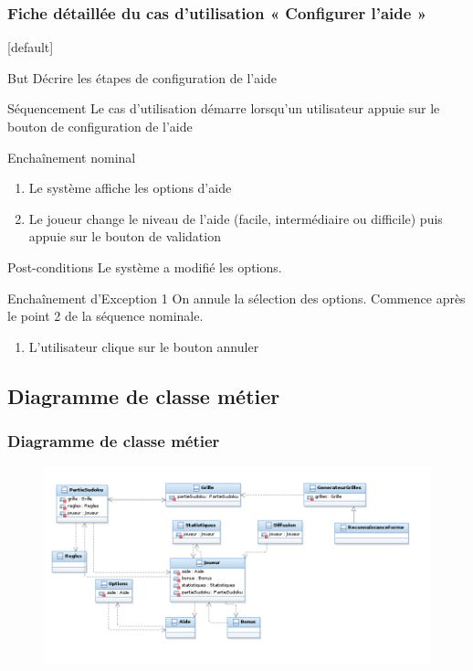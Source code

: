 \documentclass{beamer}
\begin{document}
\begin{frame}
  \frametitle{Fiche détaillée du cas d'utilisation « Configurer l’aide »}
  [default]
  \begin{block}{\footnotesize{But}}
\scriptsize{Décrire les étapes de configuration de l’aide}
  \end{block}
  \pause
  \begin{block}{\footnotesize{Séquencement}}
\scriptsize{Le cas d'utilisation démarre lorsqu’un utilisateur appuie sur le bouton de configuration de l’aide}
  \end{block}
  \pause
  \begin{block}{\footnotesize{Enchaînement nominal}}
    \begin{enumerate}    
      [circle]
    \item
      \scriptsize{Le système affiche les options d’aide}
    \item
      \scriptsize{Le joueur change le niveau de l’aide (facile, intermédiaire ou difficile) puis appuie sur le bouton de validation}
    \end{enumerate}
  \end{block}
\begin{block}{\footnotesize{Post-conditions}}
Le système a modifié les options.
\end{block}
\begin{block}{\footnotesize{Enchaînement d’Exception 1}}
\scriptsize{On annule la sélection des options. Commence après le point 2 de la séquence nominale.}
\begin{enumerate}    
  [circle]
\item
  \scriptsize{L’utilisateur clique sur le bouton annuler}
\end{enumerate}
    \end{block}
\end{frame}


\subsection{Diagramme de classe métier}
\begin{frame}
\frametitle{Diagramme de classe métier}
\begin{figure}[h]
  \includegraphics[scale=0.4]{diagrammeDeClasseMetier.png}
\end{figure}
\end{frame}
\end{document}
